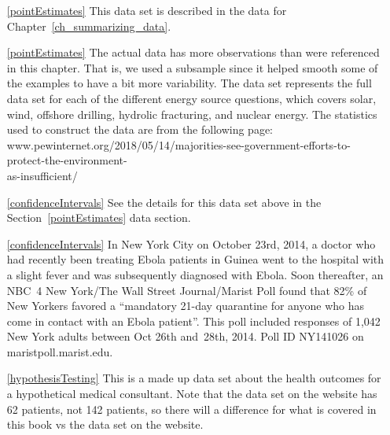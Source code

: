 \begin{itemize}

\item[\ref{pointEstimates}]
    This data set is described in
    the data for Chapter~\ref{ch_summarizing_data}.

\item[\ref{pointEstimates}]
    The actual data has more observations than were referenced
    in this chapter.
    That is, we used a subsample since it helped smooth some
    of the examples to have a bit more variability.
    The  data set represents
    the full data set for each of the different energy source
    questions, which covers solar, wind, offshore drilling,
    hydrolic fracturing, and nuclear energy.
    The statistics used to construct the data are from
    the following page: \\
        {{\small{www.pewinternet.org/2018/05/14/majorities-see-government-efforts-to-protect-the-environment-\\as-insufficient/}}}
    
\item[\ref{confidenceIntervals}]
    See the details for this data set above
    in the Section~\ref{pointEstimates} data section.
\item[\ref{confidenceIntervals}]
    In New York City on October 23rd, 2014, a doctor who had
    recently been treating Ebola patients in Guinea went to
    the hospital with a slight fever and was subsequently
    diagnosed with Ebola.
    Soon thereafter, an NBC~4 New York/The Wall Street
    Journal/Marist Poll found that
    82\% of New Yorkers favored a
    ``mandatory 21-day quarantine for anyone who has come
    in contact with an Ebola patient''.
    This poll included responses of 1,042
    New York adults between Oct 26th and~28th, 2014.
        {Poll ID NY141026 on maristpoll.marist.edu}.

\item[\ref{hypothesisTesting}]
    This is a made up data set about the health outcomes
    for a hypothetical medical consultant.
    Note that the data set on the website has 62 patients,
    not 142 patients, so there will a difference for what
    is covered in this book vs the data set on the website.

\end{itemize}



